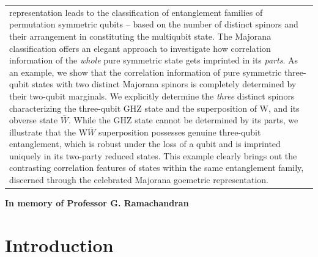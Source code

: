 \begin{longtable}{p{8cm}}
representation leads  to the classification of entanglement families of permutation symmetric qubits -- based on the number of distinct  spinors  and their arrangement in constituting the multiqubit state. The Majorana classification offers an elegant approach to investigate how correlation information of the {\em whole}  pure symmetric state gets imprinted in its {\em parts}. As an example, we show that the correlation information of pure symmetric three-qubit states with two distinct Majorana spinors is completely determined by their two-qubit marginals. We explicitly determine the {\emph {three}} distinct spinors characterizing the three-qubit GHZ state and the superposition of W, and its obverse state $\bar W$. While the GHZ state cannot be determined by its parts, we illustrate that the W$\bar W$ superposition possesses genuine three-qubit entanglement, which is robust under the loss of a qubit and is imprinted uniquely in its two-party reduced states. This example clearly brings out the contrasting correlation features of states within the same entanglement family, discerned through the celebrated Majorana goemetric representation.  
\end{longtable}


\begin{center}
\textbf{\Large In memory of Professor G. Ramachandran}
\end{center}

\renewcommand{\thesection}{\Roman{section}}
\section{Introduction}\label{chap26-sec1}

